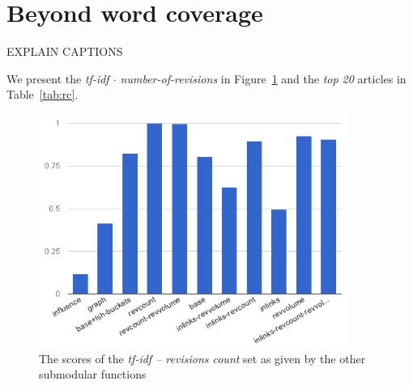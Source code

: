 \section{Beyond word coverage}

EXPLAIN 
CAPTIONS 

We present the \emph{tf-idf \(\cdot\) number-of-revisions} in
Figure~\ref{img:rc} and the \emph{top 20} articles in Table~\ref{tab:rc}.
\begin{figure}
  \centering
  \includegraphics[width=0.9\textwidth,natwidth=555,natheight=419]{images/rc.png}
  \caption{The scores of the \emph{tf-idf -- revisions count} set as given by
  the other submodular functions}
  \label{img:rc}
\end{figure}
